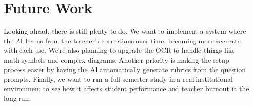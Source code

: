 \documentclass[conference]{IEEEtran}
\begin{document}
\section{Future Work}

Looking ahead, there is still plenty to do. We want to implement a system where the AI learns from the teacher's corrections over time, becoming more accurate with each use. We're also planning to upgrade the OCR to handle things like math symbols and complex diagrams. Another priority is making the setup process easier by having the AI automatically generate rubrics from the question prompts. Finally, we want to run a full-semester study in a real institutional environment to see how it affects student performance and teacher burnout in the long run.
\end{document}
